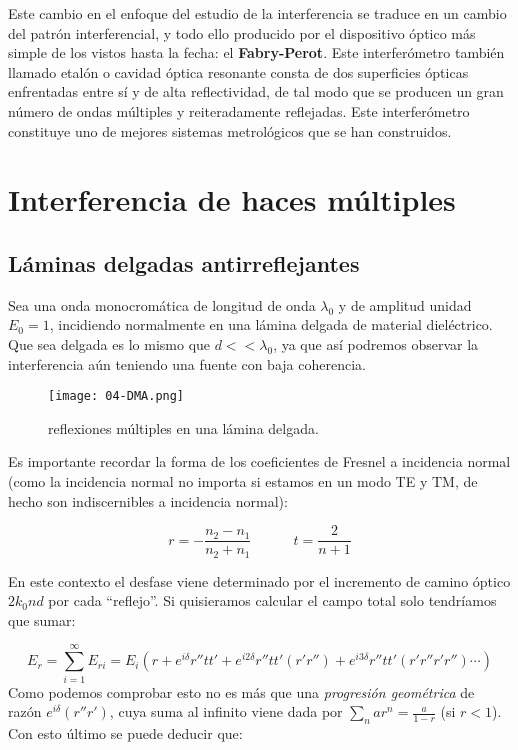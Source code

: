 \documentclass[12pt,a4paper]{book}
\numberwithin{equation}{section}
\numberwithin{figure}{section}
\newcommand{\tquad}{\quad \quad \quad}
\newcommand{\parentesis}[1]{\left( #1  \right)}
\newcommand{\1}{_{(1)}}
\newcommand{\2}{_{(2)}}
\theoremstyle{definition}
\begin{document}
Este cambio en el enfoque del estudio de la interferencia se traduce en un cambio del patrón interferencial, y todo ello producido por el dispositivo óptico más simple de los vistos hasta la fecha: el \textbf{Fabry-Perot}. Este interferómetro también llamado etalón o cavidad óptica resonante consta de dos superficies ópticas enfrentadas entre sí y de alta reflectividad, de tal modo que se producen un gran número de ondas múltiples y reiteradamente reflejadas. Este interferómetro constituye uno de mejores sistemas metrológicos que se han construidos. \\

\section{Interferencia de haces múltiples}

\subsection{Láminas delgadas antirreflejantes}

Sea una onda monocromática de longitud de onda $\lambda_0$ y de amplitud unidad $E_0=1$, incidiendo normalmente en una lámina delgada de material dieléctrico. Que sea delgada es lo mismo que $d<<\lambda_0$, ya que así podremos observar la interferencia aún teniendo una fuente con baja coherencia. \\

\begin{figure}[h!] \centering
\texttt{[image: 04-DMA.png]}
\caption{reflexiones múltiples en una lámina delgada.}
\end{figure}

Es importante recordar la forma de los coeficientes de Fresnel a incidencia normal (como la incidencia normal no importa si estamos en un modo TE y TM, de hecho son indiscernibles a incidencia normal):

\begin{equation}
r=-\frac{n_2-n_1}{n_2+n_1} \tquad t = \frac{2}{n+1}
\label{Ec:04.2-01}
\end{equation}

En este contexto el desfase viene determinado por el incremento de camino óptico $2k_0nd$ por cada ``reflejo''. Si quisieramos calcular el campo total solo tendríamos que sumar: 

\begin{equation}
E_r = \sum_{i=1}^{\infty} E_{ri} = E_i \parentesis{r+e^{i\delta}r''tt'+e^{i2\delta}r''tt'(r'r'')+e^{i3\delta}r''tt'(r'r''r'r'') \cdots}
\end{equation}
Como podemos comprobar esto no es más que una \textit{progresión geométrica} de razón $e^{i\delta}(r''r')$, cuya suma al infinito viene dada por $\sum_n ar^{n} = \frac{a}{1-r}$ (si $r<1$). Con esto último se puede deducir que:
\end{document}
